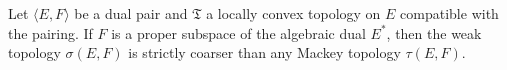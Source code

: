 Let $\langle E, F \rangle$ be a dual pair and $\mathfrak{T}$ a locally convex topology on $E$ compatible with the pairing. If $F$ is a proper subspace of the algebraic dual $E^*$, then the weak topology $\sigma(E, F)$ is strictly coarser than any Mackey topology $\tau(E, F)$.
